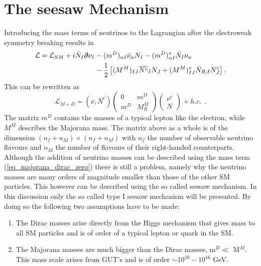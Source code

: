 \section{The seesaw Mechanism}
Introducing the mass terms of neutrinos to the Lagrangian after the electroweak symmetry breaking results in \cite[pp. 4f]{Drewes:2013gca}
\begin{align}
\mathcal{L}=\mathcal{L}_{SM}+i\bar{N}_{I}\slashed\partial\nu_{I}&-(m^D)_{\alpha I}\bar{\nu}_{\alpha}N_{I}-(m^D)_{\alpha I}^*\bar{N}_{I}\nu_{\alpha}
\label{eq:lagrangian_mass}
\\
&-\frac{1}{2}\left[(M^M)_{IJ}\overline{N^c}_{I}N_{J}+(M^M)^*_{IJ}\bar{N}_{R,I}N^c_{J}\right]\nonumber.
\end{align}
This can be rewritten as\cite[Eq. (12)]{Drewes:2013gca}
\begin{equation}
\mathcal{L}_{M+D}=\left(\overline{\nu},\overline{N}^c\right)	\left(\begin{array}{cc}0&m^D\\m^D&M^M_R\end{array}\right)	\left(\begin{array}{c}\nu^c\\N\end{array}\right)+h.c.\:\:.
\label{eq:majorana_dirac_zero}
\end{equation}
The matrix $m^D$ contains the masses of a typical lepton like the electron, while $M^M$ describes the Majorana mass. The matrix above as a whole is of the dimension \newline $(n_f+n_M)\times(n_f+n_M)$ with $n_f$ the number of observable neutrino flavours and $n_M$ the number of flavours of their right-handed counterparts. \newline\indent
Although the addition of neutrino masses can be described using the mass term (\ref{eq_majorana_dirac_zero})
there is still a problem, namely why the neutrino masses are many orders of magnitude smaller than those of the other SM particles. This however can be described using the so called seesaw mechanism. In this discussion only the so called type I seesaw mechanism will be presented. By doing so the following two assumptions have to be made:
\begin{enumerate}
	\item The Dirac masses arise directly from the Higgs mechanism that gives mass to all SM particles and is of order of a typical lepton or quark in the SM.
	\item The Majorana masses are much bigger than the Dirac masses, m$^D\ll$ M$^M$. This mass scale arises from GUT's and is of order $\sim10^{10}-10^{16}$ GeV.
\end{enumerate}
